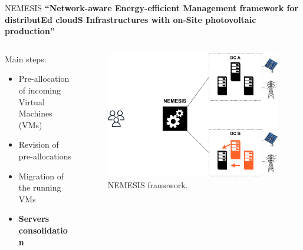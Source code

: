 \documentclass[Ligatures=TeX,table,svgnames,usetotalslideindicator,compress,10pt,aspectratio=169]{beamer}
\begin{document}
\begin{frame}{NEMESIS}
  \textbf {``\alert{N}etwork-aware \alert{E}nergy-efficient
    \alert{M}anagement framework for distribut\alert{E}d cloud\alert{S} \alert{I}nfrastructures with on-\alert{S}ite photovoltaic production''}
\begin{columns}        
    \begin{column}{0.4\textwidth}
Main steps:
\small
\begin{itemize}
    \item Pre-allocation of incoming Virtual Machines (VMs)
    \item Revision of pre-allocations
    \item Migration of the running VMs
    \item \alert{\textbf{Servers consolidation}}
\end{itemize}
\end{column}

\begin{column}{0.6\textwidth}
      \begin{figure}[!h]
        \centering
        \includegraphics[width=.85\textwidth]{images/nemesis_server_consolidation.pdf}
        \caption{NEMESIS framework.}
      \end{figure}
    \end{column}        
\end{columns}
\end{frame}

\addtocounter{framenumber}{-1}
\end{document}
